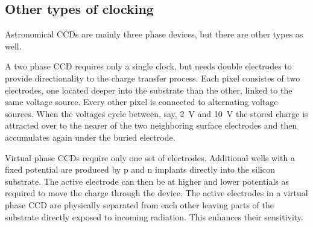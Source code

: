 \subsection{Other types of clocking}

Astronomical CCDs are mainly three phase devices, but there are other types
as well. 

A two phase CCD requires only a single clock, but needs double electrodes 
to provide directionality to the charge transfer process. Each pixel consistes
of two electrodes, one located deeper into the substrate than the other, 
linked to the same voltage source. Every other pixel is connected to 
alternating voltage sources. When the voltages cycle between, say, 2~V and
10~V the stored charge is attracted over to the nearer of the two neighboring
surface electrodes and then accumulates again under the buried electrode.

Virtual phase CCDs require only one set of electrodes. Additional wells with
a fixed potential are produced by p and n implants directly into the silicon
substrate. The active electrode can then be at higher and lower potentials 
as required to move the charge through the device. The active electrodes
in a virtual phase CCD are physically separated from each other leaving 
parts of the substrate directly exposed to incoming radiation. This 
enhances their sensitivity.

